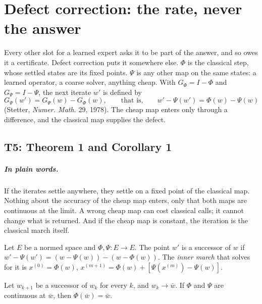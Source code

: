 \chapter{Defect correction: the rate, never the answer}

Every other slot for a learned expert asks it to be part of the answer, and so
owes it a certificate.  Defect correction puts it somewhere else.  $\Phi$ is the
classical step, whose settled states are its fixed points.  $\Psi$ is any other
map on the same states: a learned operator, a coarse solver, anything cheap.
With $G_\Phi=I-\Phi$ and $G_\Psi=I-\Psi$, the next iterate $w'$ is defined by
\[
  G_\Psi(w')=G_\Psi(w)-G_\Phi(w),\qquad\text{that is,}\qquad
  w'-\Psi(w')=\Phi(w)-\Psi(w)
\]
(Stetter, \emph{Numer. Math.} 29, 1978).  The cheap map enters only through a
difference, and the classical map supplies the defect.

\section{T5: Theorem 1 and Corollary 1}

\paragraph{In plain words.}
If the iterates settle anywhere, they settle on a fixed point of the classical
map.  Nothing about the accuracy of the cheap map enters, only that both maps
are continuous at the limit.  A wrong cheap map can cost classical calls; it
cannot change what is returned.  And if the cheap map is constant, the
iteration is the classical march itself.

\begin{definition}\label{def:dec-step}
  \leanok
  Let $E$ be a normed space and $\Phi,\Psi:E\to E$.  The point $w'$ is a
  successor of $w$ if $w'-\Psi(w')=(w-\Psi(w))-(w-\Phi(w))$.  The \emph{inner
  march} that solves for it is $x^{(0)}=\Phi(w)$,
  $x^{(m+1)}=\Phi(w)+[\Psi(x^{(m)})-\Psi(w)]$.
\end{definition}

\begin{theorem}\label{thm:T5}
  \leanok
  Let $w_{k+1}$ be a successor of $w_k$ for every $k$, and $w_k\to\bar w$.  If
  $\Phi$ and $\Psi$ are continuous at $\bar w$, then $\Phi(\bar w)=\bar w$.
\end{theorem}


